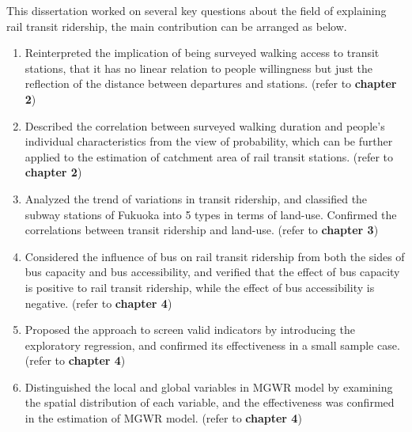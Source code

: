 This dissertation worked on several key questions about the field of explaining rail transit ridership, the main contribution can be arranged as below.

\begin{enumerate}
	\item Reinterpreted the implication of being surveyed walking access to transit stations, that it has no linear relation to people willingness but just the reflection of the distance between departures and stations. (refer to \textbf{chapter 2})
	
	\item Described the correlation between surveyed walking duration and people's individual characteristics from the view of probability, which can be further applied to the estimation of catchment area of rail transit stations. (refer to \textbf{chapter 2})
	
	\item Analyzed the trend of variations in transit ridership, and classified the subway stations of Fukuoka into 5 types in terms of land-use. Confirmed the correlations between transit ridership and land-use. (refer to \textbf{chapter 3})
	
	\item Considered the influence of bus on rail transit ridership from both the sides of bus capacity and bus accessibility, and verified that the effect of bus capacity is positive to rail transit ridership, while the effect of bus accessibility is negative. (refer to \textbf{chapter 4})
	
	\item Proposed the approach to screen valid indicators by introducing the exploratory regression, and confirmed its effectiveness in a small sample case. (refer to \textbf{chapter 4})
	
	\item Distinguished the local and global variables in MGWR model by examining the spatial distribution of each variable, and the effectiveness was confirmed in the estimation of MGWR model. (refer to \textbf{chapter 4})
	

\end{enumerate}

